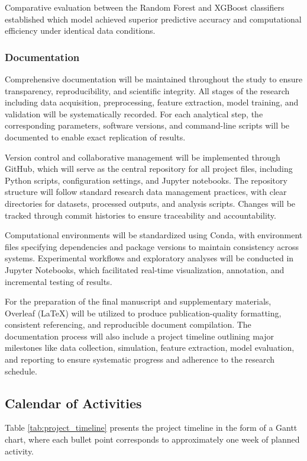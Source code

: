\documentclass{article}
\begin{document}
Comparative evaluation between the Random Forest and XGBoost classifiers established which model achieved superior predictive accuracy and computational efficiency under identical data conditions.

\subsubsection{Documentation} 
Comprehensive documentation will be maintained throughout the study to ensure transparency, reproducibility, and scientific integrity. All stages of the research including data acquisition, preprocessing, feature extraction, model training, and validation will be systematically recorded. For each analytical step, the corresponding parameters, software versions, and command-line scripts will be documented to enable exact replication of results.

Version control and collaborative management will be implemented through GitHub, which will serve as the central repository for all project files, including Python scripts, configuration settings, and Jupyter notebooks. The repository structure will follow standard research data management practices, with clear directories for datasets, processed outputs, and analysis scripts. Changes will be tracked through commit histories to ensure traceability and accountability. 

Computational environments will be standardized using Conda, with environment files specifying dependencies and package versions to maintain consistency across systems. Experimental workflows and exploratory analyses will be conducted in Jupyter Notebooks,  which facilitated real-time visualization, annotation, and incremental testing of results.

For the preparation of the final manuscript and supplementary materials, Overleaf (LaTeX) will be utilized to produce publication-quality formatting, consistent referencing, and reproducible document compilation. The documentation process will also include a project timeline outlining major milestones like data collection, simulation, feature extraction, model evaluation, and reporting to ensure systematic progress and adherence to the research schedule.

 \subsection{Calendar of Activities} 
 Table \ref{tab:project_timeline} presents the project timeline in the form of a Gantt chart, where each bullet point corresponds to approximately one week of planned activity.
\end{document}
